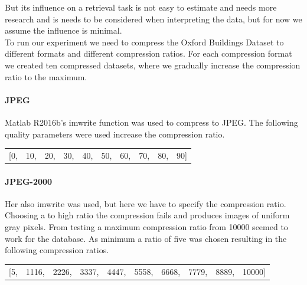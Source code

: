 \documentclass[10pt,a4paper]{article}
\begin{document}
But its influence on a retrieval task is not easy to estimate and needs more research and is needs to be considered when interpreting the data, but for now we assume the influence is minimal.\\
To run our experiment we need to compress the Oxford Buildings Dataset to different formats and different compression ratios. For each compression format we created ten compressed datasets, where we gradually increase the compression ratio to the maximum.\\
\newpage
\paragraph{JPEG} Matlab R2016b's imwrite function was used to compress to JPEG. The following quality parameters were used increase the compression ratio.
\begin{center}
	\begin{tabular}{cccccccccc}
		[0,&10,&20,&30,&40,&50,&60,&70,&80,&90]
	\end{tabular}
\end{center}
\paragraph{JPEG-2000} Her also imwrite was used, but here we have to specify the compression ratio. Choosing a to high ratio the compression fails and produces images of uniform gray pixels. From testing a maximum compression ratio from 10000 seemed to work for the database. As minimum a ratio of five was chosen resulting in the following compression ratios.
\begin{center}
	\begin{tabular}{cccccccccc}
		[5,&1116,&2226,&3337,&4447,&5558,&6668,&7779,&8889,&10000]
	\end{tabular}
\end{center}
\end{document}
